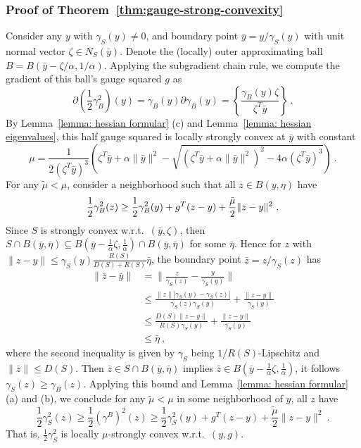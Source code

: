 \documentclass[sn-mathphys,Numbered]{sn-jnl}%
\begin{document}
\subsubsection{Proof of Theorem~\ref{thm:gauge-strong-convexity}} \label{pf:gauge-strong-convexity}
Consider any $y$ with $\gamma_S(y) \neq 0$, and boundary point $\bar y = y/\gamma_S(y)$ with unit normal vector $\zeta \in N_S(\bar y)$. Denote the (locally) outer approximating ball $B=B(\bar y-\zeta/\alpha, 1/\alpha).$ Applying the subgradient chain rule, we compute the gradient of this ball's gauge squared $g$ as
\begin{equation} \label{eq:subgrad_gauge_square_ball}
 \partial \left(\frac{1}{2}\gamma^2_B\right)(y)=\gamma_B(y) \partial \gamma_B(y) = \left\{\frac{\gamma_B(y)\zeta}{\zeta^T\bar y}\right\} \ .
\end{equation}
By Lemma~\ref{lemma: hessian formular} (c) and Lemma~\ref{lemma: hessian eigenvalues}, this half gauge squared is locally strongly convex at $\bar y$ with constant 
$$\mu = \frac{1}{2( \zeta^T \bar y)^3}\left( \zeta^T \bar y+\alpha\|\bar y\|^2-\sqrt{\left( \zeta ^T\bar y+\alpha\|\bar y\|^2\right)^2-4\alpha( \zeta^T \bar y)^3}\right) \ .
$$
For any $\tilde \mu < \mu$, consider a neighborhood such that all $z\in B(y,\eta)$ have
$$\frac{1}{2}\gamma_B^2(z) \geq \frac{1}{2}\gamma_B^2(y) + g^T(z-y) +\frac{\Tilde{\mu}}{2}\|z-y\|^2 \ . $$
Since $S$ is strongly convex w.r.t.~$(\bar y, \zeta)$, then $ S \cap B(\bar y, \bar \eta) \subseteq B\left(\bar y - \frac{1}{\alpha}\zeta, \frac{1}{\alpha}\right) \cap B(\bar y, \bar \eta)$ for some $\bar \eta$. Hence for $z$ with $\|z-y\|\leq \gamma_S(y)\frac{R(S)}{D(S)+R(S)}\bar \eta$, the boundary point $\bar z =z/\gamma_S(z)$ has 
\begin{align*}
\|\bar z -\bar y\|&=\|\frac{z}{\gamma_S(z)}-\frac{y}{\gamma_S(y)}\| \\
&\leq \frac{\|z\||\gamma_S(y)-\gamma_S(z)|}{\gamma_S(z)\gamma_S(y)}+\frac{\|z-y\|}{\gamma_S(y)} \\
&\leq \frac{D(S)\|z-y\|}{R(S)\gamma_S(y)}+\frac{\|z-y\|}{\gamma_S(y)} \\
&\leq \bar \eta \ ,
\end{align*}
where the second inequality is given by $\gamma_S$ being $1/R(S)$-Lipschitz and $\|\bar z\|\leq D(S)$. Then $\bar z \in S \cap B(\bar y, \bar \eta)$ implies $\bar z \in B\left(\bar y - \frac{1}{\alpha}\zeta, \frac{1}{\alpha}\right)$, it follows $\gamma_S(z) \geq \gamma_B(z)$.
Applying this bound and Lemma~\ref{lemma: hessian formular} (a) and (b), we conclude for any $\tilde \mu <\mu$ in some neighborhood of $y$, all $z$ have
\begin{equation} \label{equ:lower_bound}
\frac{1}{2}\gamma_S^2(z) \geq \frac{1}{2}(\gamma^B)^2(z) \geq \frac{1}{2}\gamma_S^2(y) + g^T(z-y) +\frac{\tilde \mu}{2}\|z-y\|^2 \ .
\end{equation}
That is, $\frac{1}{2}\gamma^2_S$ is locally $\mu$-strongly convex w.r.t.~$(y,g)$.
\end{document}
